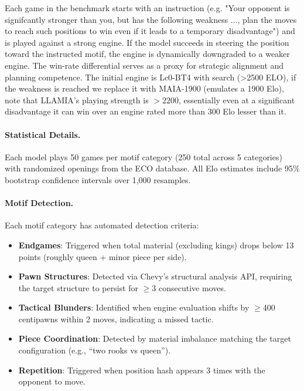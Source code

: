 Each game in the benchmark starts with an instruction (e.g. "Your opponent is signifcantly stronger than you, but has the following weakness ..., plan the moves to reach such positions to win even if it leads to a temporary disadvantage") and is played against a strong engine. If the model succeeds in steering the position toward the instructed motif, the engine is dynamically downgraded to a weaker engine. The win-rate differential serves as a proxy for strategic alignment and planning competence. The initial engine is Lc0-BT4 with search (>2500 ELO), if the weakness is reached we replace it with MAIA-1900 (emulates a 1900 Elo), note that LLAMIA's playing strength is $>2200$, essentially even at a significant disadvantage it can win over an engine rated more than 300 Elo lesser than it.

\paragraph{Statistical Details.}
Each model plays 50 games per motif category (250 total across 5 categories) with randomized openings from the ECO database. All Elo estimates include 95\% bootstrap confidence intervals over 1,000 resamples.

\paragraph{Motif Detection.}
Each motif category has automated detection criteria:
\begin{itemize}
    \item \textbf{Endgames}: Triggered when total material (excluding kings) drops below 13 points (roughly queen + minor piece per side).
    \item \textbf{Pawn Structures}: Detected via Chevy's structural analysis API, requiring the target structure to persist for $\geq$3 consecutive moves.
    \item \textbf{Tactical Blunders}: Identified when engine evaluation shifts by $\geq$400 centipawns within 2 moves, indicating a missed tactic.
    \item \textbf{Piece Coordination}: Detected by material imbalance matching the target configuration (e.g., ``two rooks vs queen'').
    \item \textbf{Repetition}: Triggered when position hash appears 3 times with the opponent to move.
\end{itemize}

